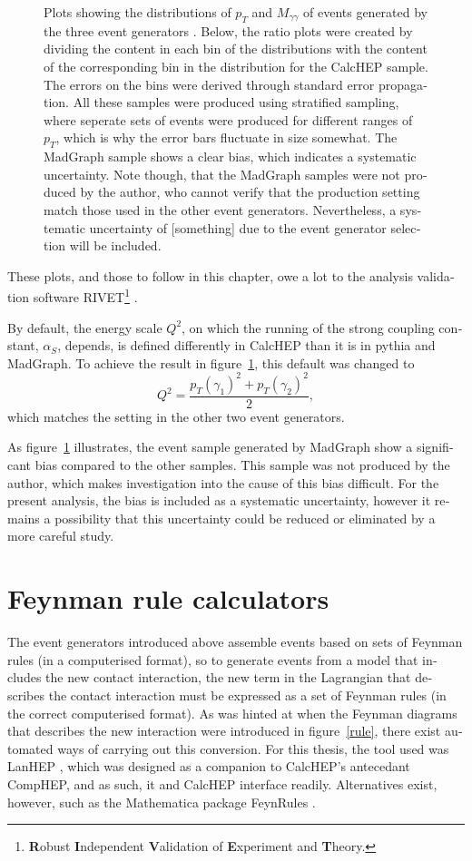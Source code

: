 \begin{english}
\begin{figure}[hbtp]
\begin{minipage}[b]{.3\textwidth}
\phantom{p}
\end{minipage}
\caption{Plots showing the distributions of $p_T$ and $M_{\gamma\gamma}$ of events generated by the three event generators \cite{calchep} \cite{pythia} \cite{madgraph5}. Below, the ratio plots were created by dividing the content in each bin of the distributions with the content of the corresponding bin in the distribution for the CalcHEP sample. The errors on the bins were derived through standard error propagation. All these samples were produced using stratified sampling, where seperate sets of events were produced for different ranges of $p_T$, which is why the error bars fluctuate in size somewhat. The MadGraph sample shows a clear bias, which indicates a systematic uncertainty. Note though, that the MadGraph samples were not produced by the author, who cannot verify that the production setting match those used in the other event generators. Nevertheless, a systematic uncertainty of [something] due to the event generator selection will be included.
\label{evgen}}
\end{figure}

These plots, and those to follow in this chapter, owe a lot to the analysis validation software RIVET\footnote{\textbf{R}obust \textbf{I}ndependent \textbf{V}alidation of \textbf{E}xperiment and \textbf{T}heory.} \cite{rivet}.

By default, the energy scale $Q^2$, on which the running of the strong coupling constant, $\alpha_S$, depends, is defined differently in CalcHEP than it is in pythia and MadGraph. To achieve the result in figure~\ref{evgen}, this default was changed to 
\[Q^2=\frac{p_T(\gamma_1)^2+p_T(\gamma_2)^2}{2},\]
which matches the setting in the other two event generators.

As figure~\ref{evgen} illustrates, the event sample generated by MadGraph show a significant bias compared to the other samples. This sample was not produced by the author, which makes investigation into the cause of this bias difficult. For the present analysis, the bias is included as a systematic uncertainty, however it remains a possibility that this uncertainty could be reduced or eliminated by a more careful study.


\section{Feynman rule calculators}
The event generators introduced above assemble events based on sets of Feynman rules (in a computerised format), so to generate events from a model that includes the new contact interaction, the new term in the Lagrangian that describes the contact interaction must be expressed as a set of Feynman rules (in the correct computerised format). As was hinted at when the Feynman diagrams that describes the new interaction were introduced in figure~\ref{rule}, there exist automated ways of carrying out this conversion. For this thesis, the tool used was LanHEP \cite{lanhep}, which was designed as a companion to CalcHEP's antecedant CompHEP, and as such, it and CalcHEP interface readily. Alternatives exist, however, such as the Mathematica package FeynRules \cite{feynrules}. 


\end{english}
